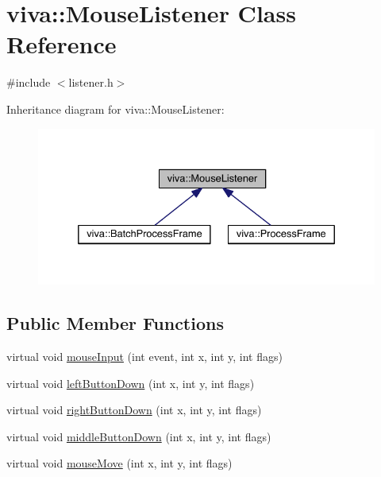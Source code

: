 \hypertarget{classviva_1_1_mouse_listener}{}\section{viva\+:\+:Mouse\+Listener Class Reference}
\label{classviva_1_1_mouse_listener}


{\ttfamily \#include $<$listener.\+h$>$}



Inheritance diagram for viva\+:\+:Mouse\+Listener\+:
\nopagebreak
\begin{figure}[H]
\begin{center}
\leavevmode
\includegraphics[width=332pt]{classviva_1_1_mouse_listener__inherit__graph}
\end{center}
\end{figure}
\subsection*{Public Member Functions}
\begin{DoxyCompactItemize}
\item 
virtual void \hyperlink{classviva_1_1_mouse_listener_aba95f99370a82ae96f89fe9a1eebd00b}{mouse\+Input} (int event, int x, int y, int flags)
\item 
virtual void \hyperlink{classviva_1_1_mouse_listener_ae2b6952da67ea99e47f5fcfa2e1780c7}{left\+Button\+Down} (int x, int y, int flags)
\item 
virtual void \hyperlink{classviva_1_1_mouse_listener_ae4a2d181ecebf2e4001ce6440339ed60}{right\+Button\+Down} (int x, int y, int flags)
\item 
virtual void \hyperlink{classviva_1_1_mouse_listener_a3a61b77b23875e74f817020ee1603556}{middle\+Button\+Down} (int x, int y, int flags)
\item 
virtual void \hyperlink{classviva_1_1_mouse_listener_af48bb769c4935f52646567118cb05900}{mouse\+Move} (int x, int y, int flags)
\end{DoxyCompactItemize}


